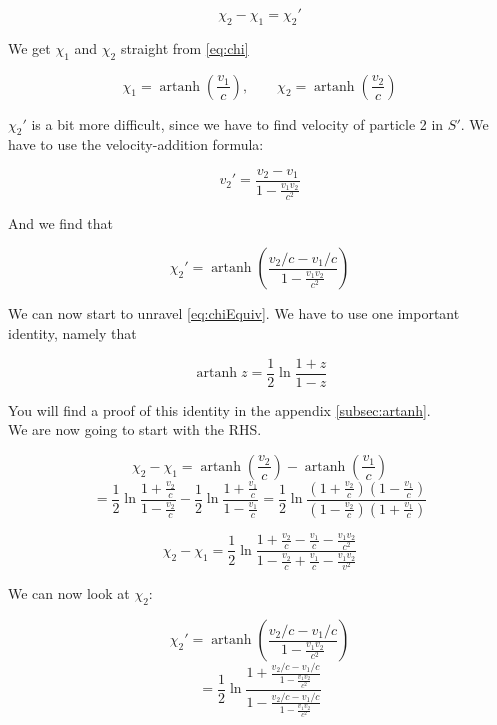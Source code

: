 \documentclass[a4paper,norsk, 10pt]{article}
\DeclareMathOperator\artanh{artanh}
\begin{document}
\begin{equation}
\chi_2 - \chi_1 = \chi_2'
\label{eq:chiEquiv}
\end{equation}


We get $\chi_1$ and $\chi_2$ straight from \eqref{eq:chi}

\begin{equation}
\chi_1 = \artanh\left(\frac{v_1}{c}\right), \qquad \chi_2 = \artanh\left(\frac{v_2}{c}\right)
\end{equation}


$\chi_2'$ is a bit more difficult, since we have to find velocity of particle 2 in $S'$. We have to use the velocity-addition formula:

\begin{equation}
v_2' = \frac{v_2 - v_1}{1 -\frac{v_1v_2}{c^2}}
\end{equation}

And we find that

\begin{equation}
\chi_2' = \artanh\left(\frac{v_2/c - v_1/c}{1 -\frac{v_1v_2}{c^2}}\right)
\end{equation}

We can now start to unravel \eqref{eq:chiEquiv}. We have to use one important identity, namely that

\begin{equation}
\artanh z = \frac{1}{2}\ln \frac{1+z}{1-z}
\end{equation}

You will find a proof of this identity in the appendix \ref{subsec:artanh}.\\

We are now going to start with the RHS.

$$
\chi_2 - \chi_1 = \artanh\left(\frac{v_2}{c}\right) - \artanh\left(\frac{v_1}{c}\right)
$$
$$
= \frac{1}{2}\ln \frac{1+\frac{v_2}{c}}{1-\frac{v_2}{c}} - \frac{1}{2}\ln \frac{1+\frac{v_1}{c}}{1-\frac{v_1}{c}} = \frac{1}{2}\ln \frac{(1+\frac{v_2}{c})(1-\frac{v_1}{c})}{(1-\frac{v_2}{c})(1+\frac{v_1}{c})}
$$

\begin{equation}
\chi_2 - \chi_1 = \frac{1}{2}\ln \frac{1 + \frac{v_2}{c} - \frac{v_1}{c} - \frac{v_1v_2}{c^2}}{1 - \frac{v_2}{c} + \frac{v_1}{c} - \frac{v_1v_2}{v^2}}
\label{eq:chiRHS}
\end{equation}

We can now look at $\chi_2$:

$$
\chi_2' = \artanh\left(\frac{v_2/c - v_1/c}{1 -\frac{v_1v_2}{c^2}}\right)
$$
$$
= \frac{1}{2}\ln \frac{1 + \frac{v_2/c - v_1/c}{1 -\frac{v_1v_2}{c^2}}}{1-\frac{v_2/c - v_1/c}{1 -\frac{v_1v_2}{c^2}}}
$$
\end{document}
